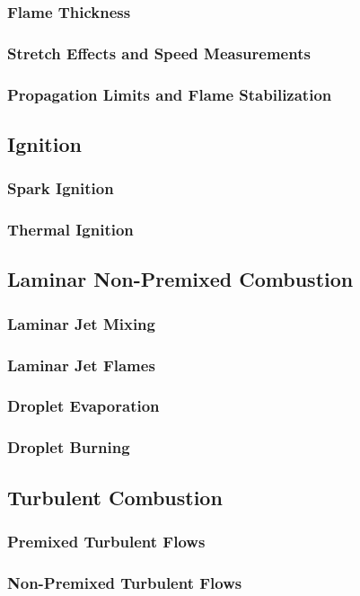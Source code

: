 \documentclass[11pt]{article}
\begin{document}
\subsubsection{Flame Thickness}
\subsubsection{Stretch Effects and Speed Measurements}
\subsubsection{Propagation Limits and Flame Stabilization}

\subsection{Ignition}
\subsubsection{Spark Ignition}
\subsubsection{Thermal Ignition}

\subsection{Laminar Non-Premixed Combustion}
\subsubsection{Laminar Jet Mixing}
\subsubsection{Laminar Jet Flames}
\subsubsection{Droplet Evaporation}
\subsubsection{Droplet Burning}

\subsection{Turbulent Combustion}
\subsubsection{Premixed Turbulent Flows}

\subsubsection{Non-Premixed Turbulent Flows}
\end{document}

